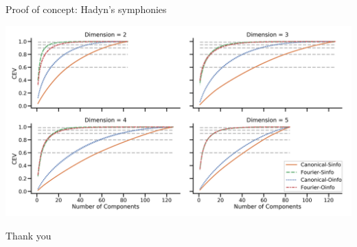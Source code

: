 \documentclass[10pt,t, handout]{beamer} %
\begin{document}
\begin{frame}{Proof of concept: Hadyn's symphonies}
	\vskip 7pt
	\pause
	
	\hspace*{-15pt}\includegraphics[scale=.096]{hyperharmonic}
\end{frame}

{
	\begin{frame}
		\vskip 6cm
		\begin{center}
			\textcolor{pblue}{\Huge Thank you}
		\end{center}
	\end{frame}
}
\end{document}
